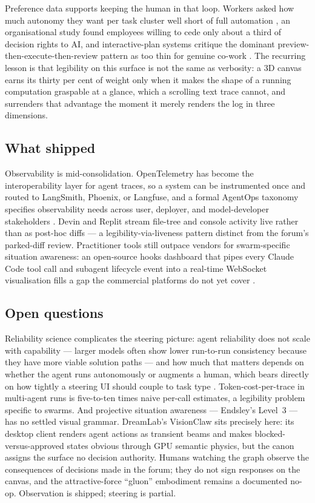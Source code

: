 Preference data supports keeping the human in that loop. Workers asked how much autonomy they want per task cluster well short of full automation \parencite{HumanAgencyScale2025}, an organisational study found employees willing to cede only about a third of decision rights to AI, and interactive-plan systems critique the dominant preview-then-execute-then-review pattern as too thin for genuine co-work \parencite{Cocoa2025}. The recurring lesson is that legibility on this surface is not the same as verbosity: a 3D canvas earns its thirty per cent of weight only when it makes the shape of a running computation graspable at a glance, which a scrolling text trace cannot, and surrenders that advantage the moment it merely renders the log in three dimensions.

\subsection{What shipped}

Observability is mid-consolidation. OpenTelemetry has become the interoperability layer for agent traces, so a system can be instrumented once and routed to LangSmith, Phoenix, or Langfuse, and a formal AgentOps taxonomy specifies observability needs across user, deployer, and model-developer stakeholders \parencite{AgentOps2024}. Devin and Replit stream file-tree and console activity live rather than as post-hoc diffs --- a legibility-via-liveness pattern distinct from the forum's parked-diff review. Practitioner tools still outpace vendors for swarm-specific situation awareness: an open-source hooks dashboard that pipes every Claude Code tool call and subagent lifecycle event into a real-time WebSocket visualisation fills a gap the commercial platforms do not yet cover \parencite{DislerObservability2025}.

\subsection{Open questions}

Reliability science complicates the steering picture: agent reliability does not scale with capability --- larger models often show lower run-to-run consistency because they have more viable solution paths --- and how much that matters depends on whether the agent runs autonomously or augments a human, which bears directly on how tightly a steering UI should couple to task type \parencite{AgentReliability2026}. Token-cost-per-trace in multi-agent runs is five-to-ten times naive per-call estimates, a legibility problem specific to swarms. And projective situation awareness --- Endsley's Level~3 --- has no settled visual grammar. DreamLab's VisionClaw sits precisely here: its desktop client renders agent actions as transient beams and makes blocked-versus-approved states obvious through GPU semantic physics, but the canon assigns the surface no decision authority. Humans watching the graph observe the consequences of decisions made in the forum; they do not sign responses on the canvas, and the attractive-force ``gluon'' embodiment remains a documented no-op. Observation is shipped; steering is partial.

